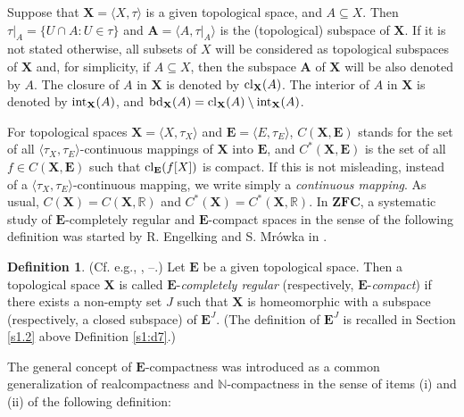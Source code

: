 \documentclass[12pt,twoside,leqno]{article}
\theoremstyle{plain}
\theoremstyle{definition}
\newtheorem{definition}[theorem]{Definition}
\theoremstyle{remark}
\DeclareMathOperator{\inter}{{\rm int}}
\DeclareMathOperator{\cl}{{\rm cl}}
\DeclareMathOperator{\bd}{{\rm bd}}
\begin{document}
Suppose that $\mathbf{X}=\langle X, \tau\rangle$ is a given topological space, and $A\subseteq X$. Then $\tau|_{A}=\{U\cap A: U\in\tau\}$ and $\mathbf{A}=\langle A, \tau|_{A}\rangle$ is the (topological) subspace of $\mathbf{X}$. If it is not stated otherwise, all subsets of $X$  will be considered as topological subspaces of $\mathbf{X}$ and, for simplicity, if $A\subseteq X$, then the subspace $\mathbf{A}$ of $\mathbf{X}$ will be also denoted by $A$. The closure of $A$ in $\mathbf{X}$ is denoted by $\cl_{\mathbf{X}}(A)$. The interior of $A$ in $\mathbf{X}$ is denoted by $\inter_{\mathbf{X}}(A)$, and $\bd_{\mathbf{X}}(A)=\cl_{\mathbf{X}}(A)\setminus\inter_{\mathbf{X}}(A)$.

For topological spaces $\mathbf{X}=\langle X, \tau_X\rangle$ and $\mathbf{E}=\langle E, \tau_E\rangle$, $C(\mathbf{X}, \mathbf{E})$ stands for the set of all $\langle \tau_X, \tau_E\rangle$-continuous mappings of $\mathbf{X}$ into $\mathbf{E}$, and $C^{\ast}(\mathbf{X}, \mathbf{E})$ is the set of all $f\in C(\mathbf{X}, \mathbf{E})$ such that $\cl_{\mathbf{E}}(f[X])$ is compact. If this is not misleading, instead of a $\langle \tau_X, \tau_E\rangle$-continuous mapping, we write simply a \emph{continuous mapping}. As usual, $C(\mathbf{X})=C(\mathbf{X}, \mathbb{R})$ and $C^{\ast}(\mathbf{X})=C^{\ast}(\mathbf{X}, \mathbb{R})$. In $\mathbf{ZFC}$, a systematic study of $\mathbf{E}$-completely regular and $\mathbf{E}$-compact spaces in the sense of the following definition was started by R. Engelking and S. Mr\'owka in \cite{enmr}.

\begin{definition}
	\label{s1:d1}
	(Cf. e.g., \cite{enmr}, \cite{mr1}--\cite{mr5}.) Let $\mathbf{E}$ be a given topological space. Then a topological space $\mathbf{X}$ is called  $\mathbf{E}$-\emph{completely regular} (respectively,  $\mathbf{E}$-\emph{compact}) if there exists a non-empty set $J$ such that $\mathbf{X}$ is homeomorphic with a subspace (respectively, a closed subspace) of $\mathbf{E}^J$. (The definition of $\mathbf{E}^J$ is recalled in Section \ref{s1.2} above Definition \ref{s1:d7}.)
\end{definition}

The general concept of $\mathbf{E}$-compactness was introduced as a common generalization of realcompactness and $\mathbb{N}$-compactness in the sense of items (i) and (ii) of the following definition:
\end{document}

